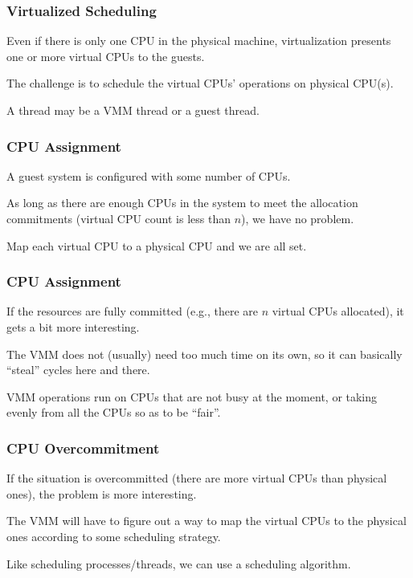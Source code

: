 \begin{frame}
\frametitle{Virtualized Scheduling}

Even if there is only one CPU in the physical machine, virtualization presents one or more virtual CPUs to the guests. 

The challenge is to schedule the virtual CPUs' operations on physical CPU(s). 

A thread may be a VMM thread or a guest thread.

\end{frame}



\begin{frame}
\frametitle{CPU Assignment}


A guest system is configured with some number of CPUs.

As long as there are enough CPUs in the system to meet the allocation commitments (virtual CPU count is less than $n$), we have no problem. 


Map each virtual CPU to a physical CPU and we are all set. 

\end{frame}

\begin{frame}
\frametitle{CPU Assignment}

If the resources are fully committed (e.g., there are $n$ virtual CPUs allocated), it gets a bit more interesting. 

The VMM does not (usually) need too much time on its own, so it can basically ``steal'' cycles here and there. 

VMM operations run on CPUs that are not busy at the moment, or taking evenly from all the CPUs so as to be ``fair''. 


\end{frame}

\begin{frame}
\frametitle{CPU Overcommitment}

If the situation is overcommitted (there are more virtual CPUs than physical ones), the problem is more interesting. 

The VMM will have to figure out a way to map the virtual CPUs to the physical ones according to some scheduling strategy. 

Like scheduling processes/threads, we can use a scheduling algorithm.

\end{frame}

